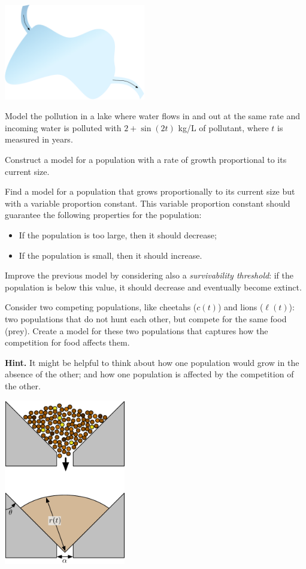 \begin{exercises}
	\begin{center}
		\includegraphics*[width=175pt]{images/module11-lake.pdf}
	\end{center}
	\begin{problist}
	\prob Model the pollution in a lake where water flows in and out at the same rate and incoming water is polluted with $2+\sin(2t)$ kg/L of pollutant, where $t$ is measured in years.
	
		
	\prob Construct a model for a population with a rate of growth proportional to its current size.
	
	\prob Find a model for a population that grows proportionally to its current size but with a variable proportion constant. This variable proportion constant should guarantee the following properties for the population:
	\begin{itemize}
		\item If the population is too large, then it should decrease;
		\item If the population is small, then it should increase.
	\end{itemize}
		
	
	\prob Improve the previous model by considering also a \emph{survivability threshold}: if the population is below this value, it should decrease and eventually become extinct.
		
	
	\prob Consider two competing populations, like cheetahs ($c(t)$) and lions ($\ell(t)$): two populations that do not hunt each other, but compete for the same food (prey). Create a model for these two populations that captures how the competition for food affects them.
	
	{\bf Hint. } It might be helpful to think about how one population would grow in the absence of the other; and how one population is affected by the competition of the other.

	\begin{center}
			\includegraphics*[width=150pt]{images/module11-stadium.pdf}
	\end{center}
		

\end{problist}
\end{exercises}
